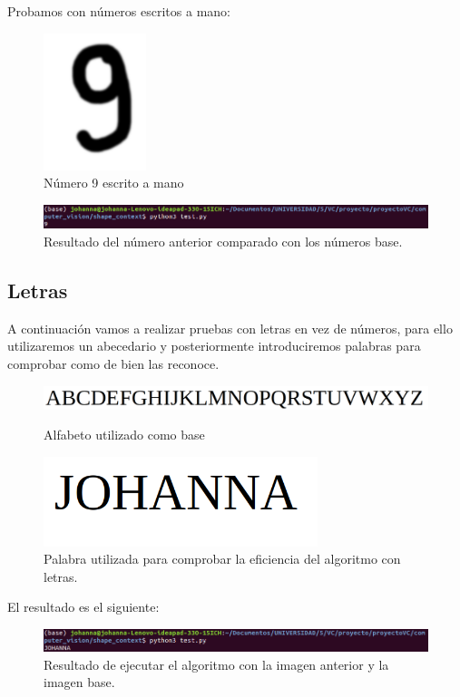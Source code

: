 \documentclass[size=a4, parskip=half, titlepage=false, toc=flat, toc=bib, 12pt]{scrartcl}
\begin{document}
Probamos con números escritos a mano:
\begin{figure}[H]
\centering
\includegraphics[width=3cm]{./img/9}
\caption{Número 9 escrito a mano}
\end{figure}
\begin{figure}[H]
\centering
\includegraphics[width=15cm]{./img/res9}
\caption{Resultado del número anterior comparado con los números base.}
\end{figure}

\subsection{Letras}%
\label{sub:letras}

A continuación vamos a realizar pruebas con letras en vez de números, para ello utilizaremos un abecedario y posteriormente introduciremos palabras para comprobar como de bien las reconoce.

\begin{figure}[H]
\centering
\includegraphics[width=15cm]{./img/ABC}
\caption{Alfabeto utilizado como base}
\includegraphics[width=8cm]{./img/JOHANNA}
\caption{Palabra utilizada para comprobar la eficiencia del algoritmo con letras.}
\end{figure}

El resultado es el siguiente:
\begin{figure}[H]
\centering
\includegraphics[width=15cm]{./img/resjohanna}
\caption{Resultado de ejecutar el algoritmo con la imagen anterior y la imagen base.}
\end{figure}
\end{document}
